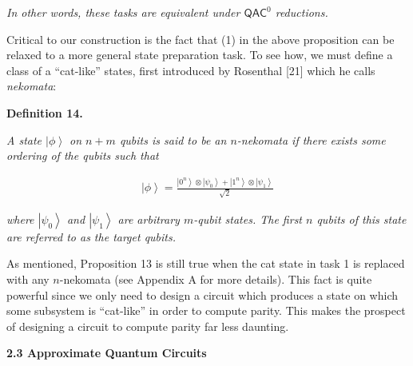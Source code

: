 \emph{In other words, these tasks are equivalent under ${\mathsf{QAC}}^{0}$ reductions.}\par






Critical to our construction is the fact that (1) in the above proposition can be relaxed to a more general state preparation task. To see how, we must define a class of a “cat-like” states, first introduced by Rosenthal [21] which he calls \emph{nekomata}:\par





\par\medskip\noindent\textbf{
\textbf{Definition 14}\textbf{.}
}\par



\emph{A state $\left|\phi\right\rangle$ on $n+m$ qubits is said to be an $n$-nekomata if there exists some ordering of the qubits such that}\par


\[\begin{gathered}
\displaystyle\left|\phi\right\rangle=\frac{\left|0^{n}\right\rangle\otimes\left|\psi_{0}\right\rangle+\left|1^{n}\right\rangle\otimes\left|\psi_{1}\right\rangle}{\sqrt{2}}
\end{gathered}\]


\emph{where $\left|\psi_{0}\right\rangle$ and $\left|\psi_{1}\right\rangle$ are arbitrary $m$-qubit states. The first $n$ qubits of this state are referred to as the target qubits.}\par






As mentioned, Proposition 13 is still true when the cat state in task 1 is replaced with any $n$-nekomata (see Appendix A for more details). This fact is quite powerful since we only need to design a circuit which produces a state on which some subsystem is “cat-like” in order to compute parity. This makes the prospect of designing a circuit to compute parity far less daunting.\par





\par\medskip\noindent\textbf{
2.3 Approximate Quantum Circuits}\par




